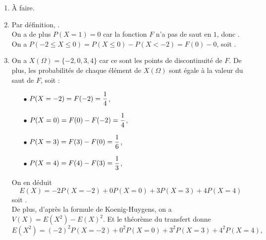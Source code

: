 \documentclass[a4paper, 11pt,reqno]{article}
\begin{document}
\begin{correction}  \;
	\begin{enumerate}
		\item \`A faire.%
		\item Par d\'efinition, .\\
		      On a de plus $P(X=1)=0$ car la fonction $F$ n'a pas de saut en $1$, donc .\\
		      On a $P(-2\leq X \leq 0) = P(X\leq 0) - P(X<-2) = F(0) - 0$, soit  .
		\item On a $X(\Omega) = \{-2, 0, 3,4\}$ car ce sont les points de discontinuit\'e de $F$. De plus, les probabilit\'es de chaque \'el\'ement de $X(\Omega)$ sont \'egale \`a la valeur du saut de $F$, soit :
		      \begin{itemize}
			      \item[$\bullet$] $\displaystyle P(X=-2) = F(-2) = \frac{1}{4}$\vsec,
			      \item[$\bullet$] $\displaystyle P(X=0) = F(0)-F(-2) = \frac{1}{4}$\vsec,
			      \item[$\bullet$] $\displaystyle P(X=3) = F(3)-F(0) = \frac{1}{6}$,\vsec
			      \item[$\bullet$] $\displaystyle P(X=4) = F(4)-F(3) = \frac{1}{3}$,\vsec
		      \end{itemize}
		      On en d\'eduit
		      $$E(X) = -2 P(X=-2) + 0 P(X=0) + 3 P(X=3) + 4 P(X=4)$$
		      soit .\\
		      De plus, d'apr\`es la formule de Koenig-Huygens, on a $V(X) = E(X^2) - E(X)^2$. Et le th\'eor\`eme du transfert donne
		      $$E(X^2) = (-2)^2 P(X=-2) + 0^2 P(X=0) + 3^2 P(X=3) + 4^2 P(X=4),$$

\end{enumerate}
\end{correction}
\end{document}
